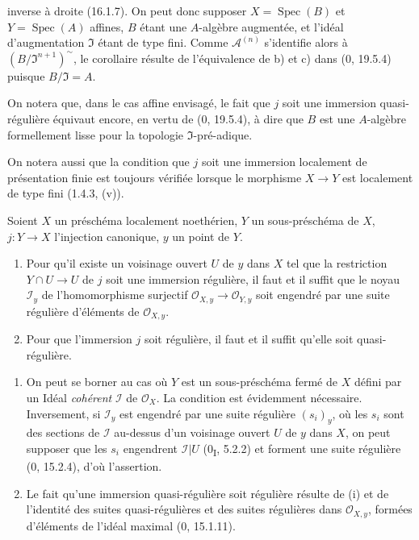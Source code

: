 inverse à droite (16.1.7). On peut donc supposer
$X=\operatorname{Spec}(B)$ et $Y=\operatorname{Spec}(A)$ affines, $B$ étant
une $A$-algèbre augmentée, et l'idéal d'augmentation $\mathfrak{I}$ étant de
type fini. Comme $\mathscr{A}^{(n)}$ s'identifie alors à
$(B/\mathfrak{I}^{n+1})^{\sim}$, le corollaire résulte de l'équivalence de b)
et c) dans (0, 19.5.4) puisque $B/\mathfrak{I}=A$.

On notera que, dans le cas affine envisagé, le fait que $j$ soit une immersion
quasi-régulière équivaut encore, en vertu de (0, 19.5.4), à dire que $B$ est
une $A$-algèbre formellement lisse pour la topologie
$\mathfrak{I}$-pré-adique.

On notera aussi que la condition que $j$ soit une immersion localement de
présentation finie est toujours vérifiée lorsque le morphisme $X\to Y$ est
localement de type fini (1.4.3, (v)).

\begin{proposition}[16.9.10]
Soient $X$ un préschéma localement noethérien, $Y$ un sous-préschéma de $X$,
$j:Y\to X$ l'injection canonique, $y$ un point de $Y$.
\begin{enumerate}
  \item[(i)] Pour qu'il existe un voisinage ouvert $U$ de $y$ dans $X$ tel que
  la restriction $Y\cap U\to U$ de $j$ soit une immersion régulière, il faut
  et il suffit que le noyau $\mathscr{I}_y$ de l'homomorphisme surjectif
  $\mathcal{O}_{X,y}\to\mathcal{O}_{Y,y}$ soit engendré par une suite régulière
  d'éléments de $\mathcal{O}_{X,y}$.
  \item[(ii)] Pour que l'immersion $j$ soit régulière, il faut et il suffit
  qu'elle soit quasi-régulière.
\end{enumerate}
\end{proposition}

\begin{enumerate}
  \item[(i)] On peut se borner au cas où $Y$ est un sous-préschéma fermé de
  $X$ défini par un Idéal \emph{cohérent} $\mathscr{I}$ de $\mathcal{O}_X$.
  La condition est évidemment nécessaire. Inversement, si $\mathscr{I}_y$
  est engendré par une suite régulière $(s_i)_y$, où les $s_i$ sont des
  sections de $\mathscr{I}$ au-dessus d'un voisinage ouvert $U$ de $y$ dans
  $X$, on peut supposer que les $s_i$ engendrent $\mathscr{I}|U$
  (0\textsubscript{I}, 5.2.2) et forment une suite régulière (0, 15.2.4),
  d'où l'assertion.
  \item[(ii)] Le fait qu'une immersion quasi-régulière soit régulière résulte
  de (i) et de l'identité des suites quasi-régulières et des suites régulières
  dans $\mathcal{O}_{X,y}$, formées d'éléments de l'idéal maximal
  (0, 15.1.11).
\end{enumerate}

